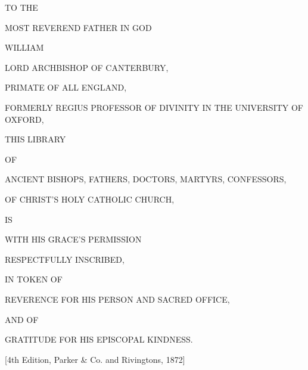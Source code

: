 



TO
THE


MOST
REVEREND FATHER IN GOD


WILLIAM


LORD ARCHBISHOP
OF CANTERBURY,


PRIMATE OF ALL
ENGLAND,


FORMERLY
REGIUS PROFESSOR OF DIVINITY IN THE UNIVERSITY OF OXFORD,


THIS LIBRARY


OF


ANCIENT
BISHOPS, FATHERS, DOCTORS, MARTYRS, CONFESSORS,


OF CHRIST’S
HOLY CATHOLIC CHURCH,


IS


WITH HIS
GRACE’S PERMISSION


RESPECTFULLY
INSCRIBED,


IN
TOKEN OF


REVERENCE FOR
HIS PERSON AND SACRED OFFICE,


AND
OF


GRATITUDE FOR
HIS EPISCOPAL KINDNESS.


[4th Edition, Parker \& Co. and
Rivingtons, 1872]


